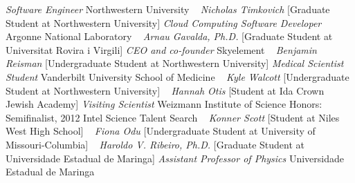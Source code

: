 \newline
    \textit{Software Engineer}
    \newline
    Northwestern University
    \newline
~
\Gap{}
\textit{Nicholas Timkovich}
    [Graduate Student at Northwestern University]
\newline
    \textit{Cloud Computing Software Developer}
    \newline
    Argonne National Laboratory
    \newline
~
\Gap{}
\textit{Arnau Gavalda, Ph.D.}
    [Graduate Student at Universitat Rovira i Virgili]
\newline
    \textit{CEO and co-founder}
    \newline
    Skyelement
    \newline
~
\Gap{}
\textit{Benjamin Reisman}
    [Undergraduate Student at Northwestern University]
\newline
    \textit{Medical Scientist Student}
    \newline
    Vanderbilt University School of Medicine
    \newline
~
\Gap{}
\textit{Kyle Walcott}
    [Undergraduate Student at Northwestern University]
\newline
~
\Gap{}
\textit{Hannah Otis}
    [Student at Ida Crown Jewish Academy]
\newline
    \textit{Visiting Scientist}
    \newline
    Weizmann Institute of Science
    \newline
    {\footnotesize Honors: Semifinalist, 2012 Intel Science Talent Search}
    \newline
~
\Gap{}
\textit{Konner Scott}
    [Student at Niles West High School]
\newline
~
\Gap{}
\textit{Fiona Odu}
    [Undergraduate Student at University of Missouri-Columbia]
\newline
~
\Gap{}
\textit{Haroldo V. Ribeiro, Ph.D.}
    [Graduate Student at Universidade Estadual de Maringa]
\newline
    \textit{Assistant Professor of Physics}
    \newline
    Universidade Estadual de Maringa
